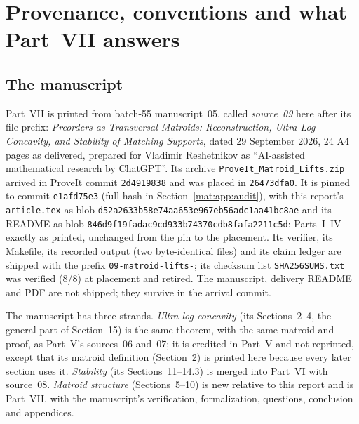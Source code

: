 \documentclass[11pt]{article}
\numberwithin{equation}{section}
\theoremstyle{definition}
\begin{document}
\section{Provenance, conventions and what Part~VII answers}
\label{mat:sec:prov}

\subsection{The manuscript}
\label{mat:sec:source}
Part~VII is printed from batch-55 manuscript~05, called \emph{source~09}
here after its file prefix: \emph{Preorders as Transversal Matroids:
Reconstruction, Ultra-Log-Concavity, and Stability of Matching Supports},
dated 29 September 2026, 24 A4 pages as delivered, prepared for Vladimir
Reshetnikov as ``AI-assisted mathematical research by ChatGPT''. Its
archive \nolinkurl{ProveIt_Matroid_Lifts.zip} arrived in ProveIt commit
\texttt{2d4919838} and was placed in \texttt{26473dfa0}. It is pinned to
commit \texttt{e1afd75e3} (full hash in Section~\ref{mat:app:audit}), with
this report's \texttt{article.tex} as blob
\texttt{d52a2633b58e74aa653e\allowbreak 967eb56adc1aa41bc8ae} and its README as
blob \texttt{846d9f19fadac9cd933b\allowbreak 74370cdb8fafa2211c5d}: Parts~I--IV
exactly as printed, unchanged from the pin to the placement. Its verifier,
its Makefile, its recorded output (two byte-identical files) and its claim
ledger are shipped with the prefix \texttt{09-matroid-lifts-}; its checksum
list \texttt{SHA256SUMS.txt} was verified (8/8) at placement and retired.
The manuscript, delivery README and PDF are not shipped; they survive in the
arrival commit.

The manuscript has three strands. \emph{Ultra-log-concavity} (its
Sections~2--4, the general part of Section~15) is the same theorem, with the
same matroid and proof, as Part~V's sources~06 and~07; it is credited in
Part~V and not reprinted, except that its matroid definition (Section~2) is
printed here because every later section uses it. \emph{Stability} (its
Sections~11--14.3) is merged into Part~VI with source~08. \emph{Matroid
structure} (Sections~5--10) is new relative to this report and is Part~VII,
with the manuscript's verification, formalization, questions, conclusion and
appendices.
\end{document}

